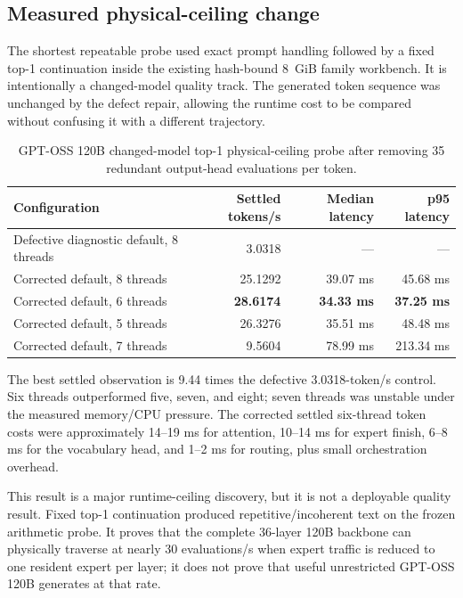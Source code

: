 \subsection{Measured physical-ceiling change}

The shortest repeatable probe used exact prompt handling followed by a fixed
top-1 continuation inside the existing hash-bound 8~GiB family workbench.  It
is intentionally a changed-model quality track.  The generated token sequence
was unchanged by the defect repair, allowing the runtime cost to be compared
without confusing it with a different trajectory.

\begin{table}[ht]
\centering
\small
\begin{tabular}{lrrr}
\toprule
Configuration & Settled tokens/s & Median latency & p95 latency \\
\midrule
Defective diagnostic default, 8 threads & 3.0318 & --- & --- \\
Corrected default, 8 threads & 25.1292 & 39.07 ms & 45.68 ms \\
Corrected default, 6 threads & \textbf{28.6174} & \textbf{34.33 ms} & \textbf{37.25 ms} \\
Corrected default, 5 threads & 26.3276 & 35.51 ms & 48.48 ms \\
Corrected default, 7 threads & 9.5604 & 78.99 ms & 213.34 ms \\
\bottomrule
\end{tabular}
\caption{GPT-OSS 120B changed-model top-1 physical-ceiling probe after removing
35 redundant output-head evaluations per token.}
\end{table}

The best settled observation is 9.44 times the defective 3.0318-token/s
control.  Six threads outperformed five, seven, and eight; seven threads was
unstable under the measured memory/CPU pressure.  The corrected settled
six-thread token costs were approximately 14--19 ms for attention, 10--14 ms
for expert finish, 6--8 ms for the vocabulary head, and 1--2 ms for routing,
plus small orchestration overhead.

This result is a major runtime-ceiling discovery, but it is not a deployable
quality result.  Fixed top-1 continuation produced repetitive/incoherent text
on the frozen arithmetic probe.  It proves that the complete 36-layer 120B
backbone can physically traverse at nearly 30 evaluations/s when expert
traffic is reduced to one resident expert per layer; it does not prove that
useful unrestricted GPT-OSS 120B generates at that rate.

